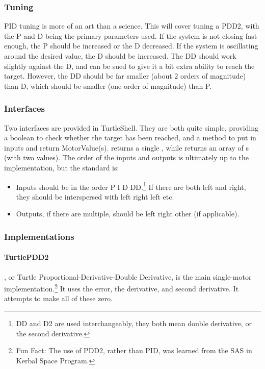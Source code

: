 \documentclass[]{report}
\begin{document}
\subsubsection{Tuning}
PID tuning is more of an art than a science.
This will cover tuning a PDD2, with the P and D being the primary parameters used.
If the system is not closing fast enough, the P should be increased or the D decreased.
If the system is oscillating around the desired value, the D should be increased.
The DD should work slightly against the D, and can be sued to give it a bit extra ability to reach the target.
However, the DD should be far smaller (about 2 orders of magnitude) than D, which should be smaller (one order of magnitude) than P.

\subsubsection{Interfaces}
Two interfaces are provided in TurtleShell.
They are both quite simple, providing a boolean to check whether the target has been reached, and a method to put in inputs and return MotorValue(s).
 returns a single , while  returns an array of s (with two values).
The order of the inputs and outputs is ultimately up to the implementation, but the standard is:
\begin{itemize}
\item Inputs should be in the order P \textrightarrow{} I \textrightarrow{} D \textrightarrow{} DD.\footnote{DD and D2 are used interchangeably, they both mean double derivative, or the second derivative.}
If there are both left and right, they should be interspersed with left \textrightarrow{} right \textrightarrow{} left \textrightarrow{} etc.
\item Outputs, if there are multiple, should be left \textrightarrow{} right \textrightarrow{} other (if applicable).
\end{itemize}

\subsubsection{Implementations}

\paragraph{TurtlePDD2}
, or Turtle Proportional-Derivative-Double Derivative, is the main single-motor implementation.\footnote{Fun Fact: The use of PDD2, rather than PID, was learned from the SAS in Kerbal Space Program.}
It uses the error, the derivative, and second derivative.
It attempts to make all of these zero.
\end{document}

